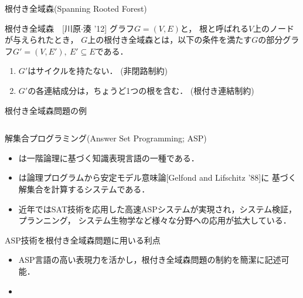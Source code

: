 \documentclass[dvipdfmx,11pt]{beamer}
\begin{document}
\begin{frame}{根付き全域森(Spanning Rooted Forest)}

 \begin{block}{根付き全域森~~[川原$\cdot$湊 '12]}
  グラフ$G=(V,E)$と，
  \alert{根}と呼ばれる$V$上のノードが与えられたとき，
  $G$上の根付き全域森とは，以下の条件を満たす$G$の部分グラフ$G'=(V,E'),\ E' \subseteq E$である．
  \begin{enumerate}
   \item $G'$はサイクルを持たない． (\alert{非閉路制約})
   \item $G'$の各連結成分は，ちょうど1つの根を含む． (\alert{根付き連結制約})
  \end{enumerate}
 \end{block}

 \begin{exampleblock}{根付き全域森問題の例}
  \begin{columns}
   \begin{column}{0.45\textwidth}
	\centering
	
   \end{column}
   \begin{column}{0.45\textwidth}
	\centering
	
   \end{column}
  \end{columns}

 \end{exampleblock}
 
\end{frame}

\begin{frame}{解集合プログラミング(Answer Set Programming; ASP)}
 \begin{itemize}
  \item {}は一階論理に基づく知識表現言語の一種である．
  \item {}は論理プログラムから安定モデル意味論[Gelfond and Lifschitz '88]に
		基づく解集合を計算するシステムである．
  \item 近年ではSAT技術を応用した高速ASPシステムが実現され，システム検証，プランニング，
		システム生物学など様々な分野への応用が拡大している．
 \end{itemize}

 \begin{alertblock}{ASP技術を根付き全域森問題に用いる利点}
   \begin{itemize}
	\item ASP言語の高い表現力を活かし，根付き全域森問題の制約を簡潔に記述可能．
	\item 
   \end{itemize}
 \end{alertblock}

\end{frame}
\end{document}
